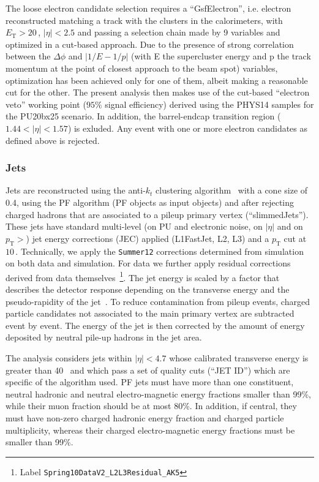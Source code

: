  The loose electron candidate selection requires a ``GsfElectron'', i.e. electron reconstructed matching a track with the clusters in the calorimeters, with $E_\mathrm{T} > 20\,$\GeV, $|\eta| < 2.5$ and passing a selection chain made by 9 variables and optimized in a cut-based approach. Due to the presence of strong correlation between the  $\Delta\phi$ and $|1/E-1/p|$ (with E the supercluster energy and p the track momentum at the point of closest approach to the beam spot) variables, optimization has been achieved only for one of them, albeit making a reasonable cut for the other. The present analysis then makes use of the cut-based ``electron veto'' working point ($95\%$ signal efficiency) derived using the PHYS14 samples for the PU20bx25 scenario. In addition, the barrel-endcap transition region ($1.44<|\eta|<1.57$) is exluded. Any event with one or more electron candidates as defined above is rejected.
 
 
 \subsubsection{Jets}
 \label{sec:jets}
 
 Jets are reconstructed using the anti-$k_t$ clustering algorithm~\cite{Cacciari:2008gp} with a cone size of 0.4, using the PF algorithm (PF objects as input objects) and after rejecting charged hadrons that are associated to a pileup primary vertex (``slimmedJets''). These jets have standard multi-level (on PU and electronic noise, on $|\eta|$ and on $p_\mathrm{T} >$) jet energy corrections (JEC) applied (L1FastJet, L2, L3) and a $p_\mathrm{T}$ cut at $10\,$\GeV. Technically, we apply the \verb+Summer12+ corrections determined from simulation on both data and simulation.  For data we further apply residual corrections derived from data themselves~\footnote{Label \texttt{Spring10DataV2\_L2L3Residual\_AK5}}. The jet energy is scaled by a factor that describes the detector response depending on the transverse energy and the pseudo-rapidity of the jet~\cite{CMS-PAS-JME-10-003}. To reduce contamination from pileup events, charged particle candidates not associated to the main primary vertex are subtracted event by event. The energy of the jet is then corrected by the amount of energy deposited by neutral pile-up hadrons in the jet area.
 
 The analysis considers jets within $|\eta|<4.7$ whose calibrated transverse energy is greater than 40~\GeV
 and which pass a set of quality cuts (``JET ID'') which are specific of the algorithm used. 
 PF jets must have more than one constituent, neutral hadronic and neutral electro-magnetic energy fractions smaller than 99\%, while their muon fraction should be at most 80\%. In addition, if central, they must have non-zero charged hadronic energy fraction and charged particle multiplicity, whereas their charged electro-magnetic energy fractions must be smaller than 99\%.
 
